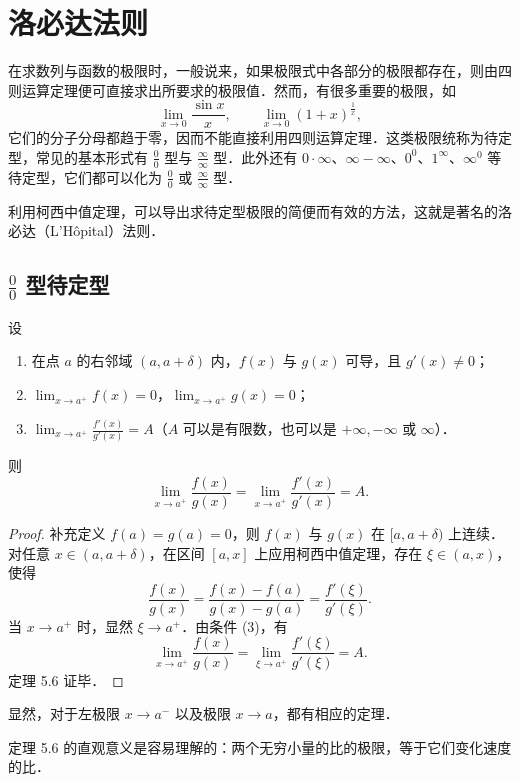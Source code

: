 \section{洛必达法则}\label{sec:5.2}

在求数列与函数的极限时，一般说来，如果极限式中各部分的极限都存在，则由四则运算定理便可直接求出所要求的极限值．然而，有很多重要的极限，如
\[
\lim_{x\to0} \frac{\sin x}{x},\qquad \lim_{x\to0} (1+x)^{\frac{1}{x}},
\]
它们的分子分母都趋于零，因而不能直接利用四则运算定理．这类极限统称为待定型，常见的基本形式有 $\frac{0}{0}$ 型与 $\frac{\infty}{\infty}$ 型．此外还有 $0\cdot\infty$、$\infty-\infty$、$0^0$、$1^\infty$、$\infty^0$ 等待定型，它们都可以化为 $\frac{0}{0}$ 或 $\frac{\infty}{\infty}$ 型．

利用柯西中值定理，可以导出求待定型极限的简便而有效的方法，这就是著名的洛必达（L'H\^opital）法则．

\subsection{\texorpdfstring{$\frac{0}{0}$}{0/0} 型待定型}

\begin{theorem}\label{thm:5-6}
设
\begin{enumerate}[(1)]
\item 在点 $a$ 的右邻域 $(a, a+\delta)$ 内，$f(x)$ 与 $g(x)$ 可导，且 $g'(x) \neq 0$；
\item $\lim_{x\to a^+} f(x) = 0$，$\lim_{x\to a^+} g(x) = 0$；
\item $\lim_{x\to a^+} \frac{f'(x)}{g'(x)} = A$（$A$ 可以是有限数，也可以是 $+\infty, -\infty$ 或 $\infty$）．
\end{enumerate}
则
\[
\lim_{x\to a^+} \frac{f(x)}{g(x)} = \lim_{x\to a^+} \frac{f'(x)}{g'(x)} = A.
\]
\end{theorem}

\begin{proof}
补充定义 $f(a) = g(a) = 0$，则 $f(x)$ 与 $g(x)$ 在 $[a, a+\delta)$ 上连续．对任意 $x \in (a, a+\delta)$，在区间 $[a, x]$ 上应用柯西中值定理，存在 $\xi \in (a, x)$，使得
\[
\frac{f(x)}{g(x)} = \frac{f(x) - f(a)}{g(x) - g(a)} = \frac{f'(\xi)}{g'(\xi)}.
\]
当 $x \to a^+$ 时，显然 $\xi \to a^+$．由条件 (3)，有
\[
\lim_{x\to a^+} \frac{f(x)}{g(x)} = \lim_{\xi\to a^+} \frac{f'(\xi)}{g'(\xi)} = A.
\]
定理 5.6 证毕．
\end{proof}

显然，对于左极限 $x \to a^-$ 以及极限 $x \to a$，都有相应的定理．

定理 5.6 的直观意义是容易理解的：两个无穷小量的比的极限，等于它们变化速度的比．

